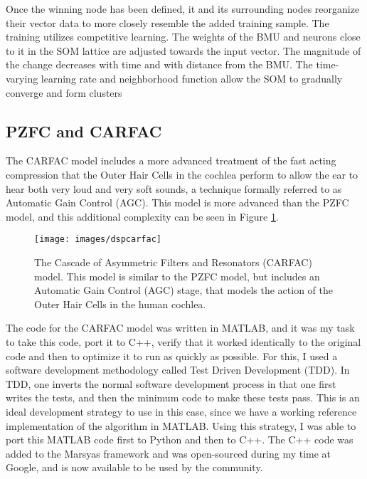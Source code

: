 Once the winning node has been defined, it and its surrounding nodes
reorganize their vector data to more closely resemble the added
training sample.  The training utilizes competitive learning. The
weights of the BMU and neurons close to it in the SOM lattice are
adjusted towards the input vector. The magnitude of the change
decreases with time and with distance from the BMU. The time-varying
learning rate and neighborhood function allow the SOM to gradually
converge and form clusters

\subsection{PZFC and CARFAC}
The CARFAC model includes a more advanced treatment of the fast acting
compression that the Outer Hair Cells in the cochlea perform to allow
the ear to hear both very loud and very soft sounds, a technique
formally referred to as Automatic Gain Control (AGC).  This model is
more advanced than the PZFC model, and this additional complexity can
be seen in Figure \ref{fig:dspcarfac}.

\begin{figure}[t]
\begin{center}
\texttt{[image: images/dspcarfac]}
\caption{
The Cascade of Asymmetric Filters and Resonators (CARFAC) model.  This
model is similar to the PZFC model, but includes an Automatic Gain
Control (AGC) stage, that models the action of the Outer Hair Cells in
the human cochlea.} 
\label{fig:dspcarfac} 
\end{center} 
\end{figure} 


The code for the CARFAC model was written in MATLAB, and it was my
task to take this code, port it to C++, verify that it worked
identically to the original code and then to optimize it to run as
quickly as possible.  For this, I used a software development
methodology called Test Driven Development \cite{fraser03} (TDD).  In
TDD, one inverts the normal software development process in that one
first writes the tests, and then the minimum code to make these tests
pass.  This is an ideal development strategy to use in this case,
since we have a working reference implementation of the algorithm in
MATLAB.  Using this strategy, I was able to port this MATLAB code
first to Python and then to C++.  The C++ code was added to the
Marsyas \cite{marsyas} framework and was open-sourced during my time
at Google, and is now available to be used by the community.

